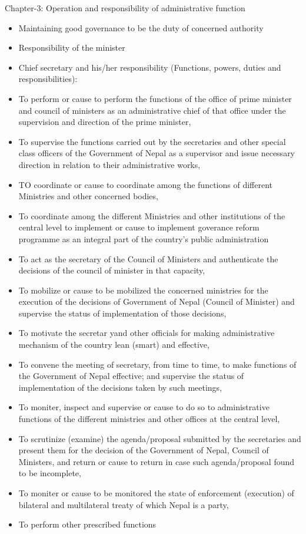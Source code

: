 \documentclass[
  openany]{book}
\providecommand{\tightlist}{%
  \setlength{\itemsep}{0pt}\setlength{\parskip}{0pt}}
\begin{document}
Chapter-3: Operation and responsibility of administrative function

\begin{itemize}
\tightlist
\item
  Maintaining good governance to be the duty of concerned authority
\item
  Responsibility of the minister
\item
  Chief secretary and his/her responsibility (Functions, powers, duties and responsibilities):
\end{itemize}

\begin{itemize}
  \item To perform or cause to perform the functions of the office of prime minister and council of ministers as an administrative chief of that office under the supervision and direction of the prime minister,
  \item To supervise the functions carried out by the secretaries and other special class officers of the Government of Nepal as a supervisor and issue necessary direction in relation to their administrative works,
  \item TO coordinate or cause to coordinate among the functions of different Ministries and other concerned bodies,
  \item To coordinate among the different Ministries and other institutions of the central level to implement or cause to implement goverance reform programme as an integral part of the country's public administration
  \item To act as the secretary of the Council of Ministers and authenticate the decisions of the council of minister in that capacity,
  \item To mobilize or cause to be mobilized the concerned ministries for the execution of the decisions of Government of Nepal (Council of Minister) and supervise the status of implementation of those decisions,
  \item To motivate the secretar yand other officials for making administrative mechanism of the country lean (smart) and effective,
  \item To convene the meeting of secretary, from time to time, to make functions of the Government of Nepal effective; and supervise the status of implementation of the decisions taken by such meetings,
  \item To moniter, inspect and supervise or cause to do so to administrative functions of the different ministries and other offices at the central level,
  \item To scrutinize (examine) the agenda/proposal submitted by the secretaries and present them for the decision of the Government of Nepal, Council of Ministers, and return or cause to return in case such agenda/proposal found to be incomplete,
  \item To moniter or cause to be monitored the state of enforcement (execution) of bilateral and multilateral treaty of which Nepal is a party,
  \item To perform other prescribed functions
  \end{itemize}
\end{document}
